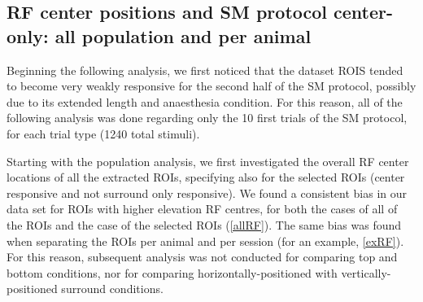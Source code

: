 \subsection{RF center positions and SM protocol center-only: all population and per animal}

Beginning the following analysis, we first noticed that the dataset ROIS tended to become very weakly responsive for the second half of the SM protocol, possibly due to its extended length and anaesthesia condition. For this reason, all of the following analysis was done regarding only the 10 first trials of the SM protocol, for each trial type (1240 total stimuli). 


Starting with the population analysis, we first investigated the overall RF center locations of all the extracted ROIs, specifying also for the selected ROIs (center responsive and not surround only responsive). We found a consistent bias in our data set for ROIs with higher elevation RF centres, for both the cases of all of the ROIs and the case of the selected ROIs (\ref{allRF}).  The same bias was found when separating the ROIs per animal and per session (for an example, \ref{exRF}). For this reason, subsequent analysis was not conducted for comparing top and bottom conditions, nor for comparing horizontally-positioned with vertically-positioned surround conditions.

